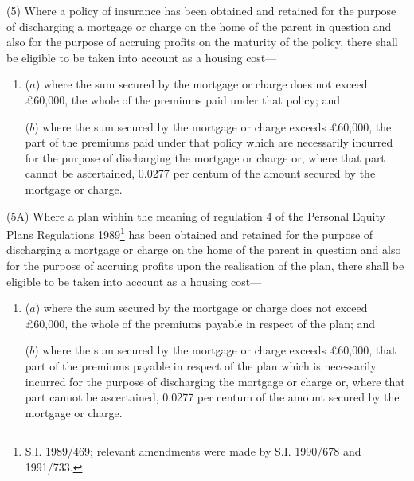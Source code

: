\documentclass[a4paper]{article}
\begin{document}

(5) Where a policy of insurance has been obtained and retained for the purpose of discharging a mortgage or charge on the home of the parent in question and also for the purpose of accruing profits on the maturity of the policy, there shall be eligible to be taken into account as a housing cost—
\begin{enumerate}\item[]
($a$) where the sum secured by the mortgage or charge does not exceed £60,000, the whole of the premiums paid under that policy; and

($b$) where the sum secured by the mortgage or charge exceeds £60,000, the part of the premiums paid under that policy which are necessarily incurred for the purpose of discharging the mortgage or charge or, where that part cannot be ascertained, 0.0277 per centum of the amount secured by the mortgage or charge.
\end{enumerate}

(5A) Where a plan within the meaning of regulation 4 of the Personal Equity Plans Regulations 1989\footnote{\frenchspacing S.I. 1989/469; relevant amendments were made by S.I. 1990/678 and 1991/733.} has been obtained and retained for the purpose of discharging a mortgage or charge on the home of the parent in question and also for the purpose of accruing profits upon the realisation of the plan, there shall be eligible to be taken into account as a housing cost—
\begin{enumerate}\item[]
($a$) where the sum secured by the mortgage or charge does not exceed £60,000, the whole of the premiums payable in respect of the plan; and

($b$) where the sum secured by the mortgage or charge exceeds £60,000, that part of the premiums payable in respect of the plan which is necessarily incurred for the purpose of discharging the mortgage or charge or, where that part cannot be ascertained, 0.0277 per centum of the amount secured by the mortgage or charge.
\end{enumerate}
\end{document}
